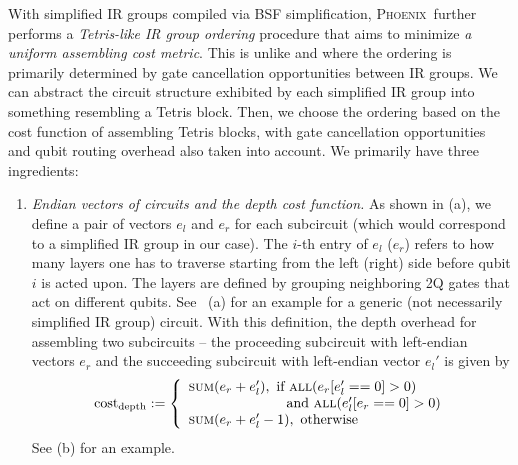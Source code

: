 \documentclass[conference,9pt]{IEEEtran}
\newcommand{\phoenix}{\textsc{Phoenix}}
\newcommand{\eRrightPre}{e_r}
\newcommand{\eLeftPost}{e_l'}
\begin{document}
    With simplified IR groups compiled via BSF simplification, \phoenix\ further performs a \emph{Tetris-like IR group ordering} procedure that aims to minimize \textit{a uniform assembling cost metric}. This is unlike \cite{li2022paulihedral} and \cite{jin2024tetris} where the ordering is primarily determined by gate cancellation opportunities between IR groups. We can abstract the circuit structure exhibited by each simplified IR group into something resembling a Tetris block. Then, we choose the ordering based on the cost function of assembling Tetris blocks, with gate cancellation opportunities and qubit routing overhead also taken into account. We primarily have three ingredients:
    \begin{enumerate}
        \item \textit{Endian vectors of circuits and the depth cost function.} As shown in  (a), we define a pair of vectors $e_l$ and $e_r$ for each subcircuit (which would correspond to a simplified IR group in our case). The $i$-th entry of $e_l$ ($e_r$) refers to how many layers one has to traverse starting from the left (right) side before qubit $i$ is acted upon. The layers are defined by grouping neighboring 2Q gates that act on different qubits. See~ (a) for an example for a generic (not necessarily simplified IR group) circuit.
        With this definition, the depth overhead for assembling two subcircuits -- the proceeding subcircuit with left-endian vectors $e_r$ and the succeeding subcircuit with left-endian vector $e_l'$ is given by
        \begin{align*}
            \mathrm{cost}_\mathrm{depth} :=  
                    \left\{
                    \begin{array}{ll}
                    \textsc{sum}(\eRrightPre + \eLeftPost),  \text{ if } \textsc{all}(\eRrightPre[\eLeftPost == 0] > 0) \\\qquad \text{    }\qquad\text{    }\qquad\text{   }\text{and }\textsc{all}(\eLeftPost[\eRrightPre == 0] > 0) \\
                    \textsc{sum}(\eRrightPre + \eLeftPost - 1), \text{ otherwise    }
                    \end{array}
                    \right.
        \end{align*}
        See  (b) for an example. %

\end{enumerate}
\end{document}
